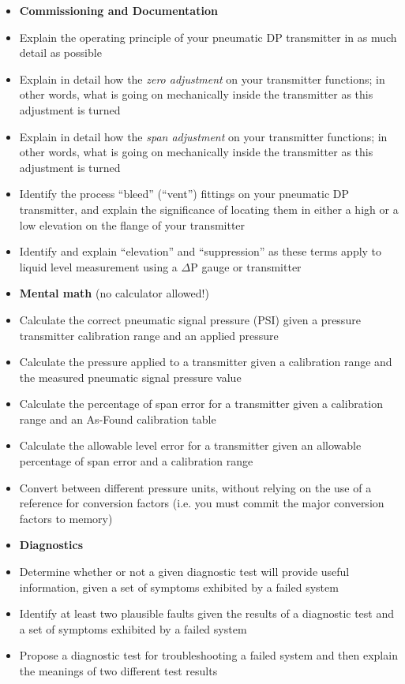 \begin{itemize}
\item{} {\bf Commissioning and Documentation}
\item{} Explain the operating principle of your pneumatic DP transmitter in as much detail as possible
\item{} Explain in detail how the {\it zero adjustment} on your transmitter functions; in other words, what is going on mechanically inside the transmitter as this adjustment is turned
\item{} Explain in detail how the {\it span adjustment} on your transmitter functions; in other words, what is going on mechanically inside the transmitter as this adjustment is turned
\item{} Identify the process ``bleed'' (``vent'') fittings on your pneumatic DP transmitter, and explain the significance of locating them in either a high or a low elevation on the flange of your transmitter
\item{} Identify and explain ``elevation'' and ``suppression'' as these terms apply to liquid level measurement using a $\Delta$P gauge or transmitter
\end{itemize}

\filbreak

\begin{itemize}
\item{} {\bf Mental math} (no calculator allowed!)
\item{} Calculate the correct pneumatic signal pressure (PSI) given a pressure transmitter calibration range and an applied pressure 
\item{} Calculate the pressure applied to a transmitter given a calibration range and the measured pneumatic signal pressure value
\item{} Calculate the percentage of span error for a transmitter given a calibration range and an As-Found calibration table 
\item{} Calculate the allowable level error for a transmitter given an allowable percentage of span error and a calibration range
\item{} Convert between different pressure units, without relying on the use of a reference for conversion factors (i.e. you must commit the major conversion factors to memory)
\end{itemize}

\filbreak

\begin{itemize}
\item{} {\bf Diagnostics}
\item{} Determine whether or not a given diagnostic test will provide useful information, given a set of symptoms exhibited by a failed system
\item{} Identify at least two plausible faults given the results of a diagnostic test and a set of symptoms exhibited by a failed system
\item{} Propose a diagnostic test for troubleshooting a failed system and then explain the meanings of two different test results
\end{itemize}



